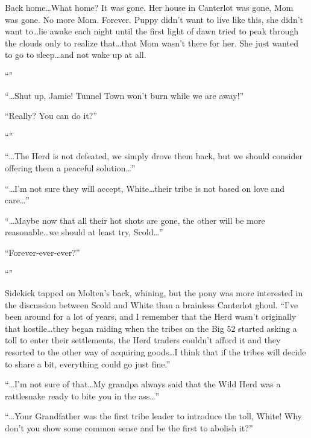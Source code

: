 Back home\dots What home? It was gone. Her house in Canterlot was gone, Mom was gone. No more Mom. Forever. Puppy didn't want to live like this, she didn't want to\dots lie awake each night until the first light of dawn tried to peak through the clouds only to realize that\dots that Mom wasn't there for her. She just wanted to go to sleep\dots and not wake up at all.

``''

``\dots Shut up, Jamie! Tunnel Town won't burn while we are away!''

``Really? You can do it?''

``''

``\dots The Herd is not defeated, we simply drove them back, but we should consider offering them a peaceful solution\dots''

``\dots I'm not sure they will accept, White\dots their tribe is not based on love and care\dots''

``\dots Maybe now that all their hot shots are gone, the other will be more reasonable\dots we should at least try, Scold\dots''

``Forever-ever-ever?''

``''

Sidekick tapped on Molten's back, whining, but the pony was more interested in the discussion between Scold and White than a brainless Canterlot ghoul. ``I've been around for a lot of years, and I remember that the Herd wasn't originally that hostile\dots they began raiding when the tribes on the Big 52 started asking a toll to enter their settlements, the Herd traders couldn't afford it and they resorted to the other way of acquiring goods\dots I think that if the tribes will decide to share a bit, everything could go just fine.''

``\dots I'm not sure of that\dots My grandpa always said that the Wild Herd was a rattlesnake ready to bite you in the ass\dots''

``\dots Your Grandfather was the first tribe leader to introduce the toll, White! Why don't you show some common sense and be the first to abolish it?''

